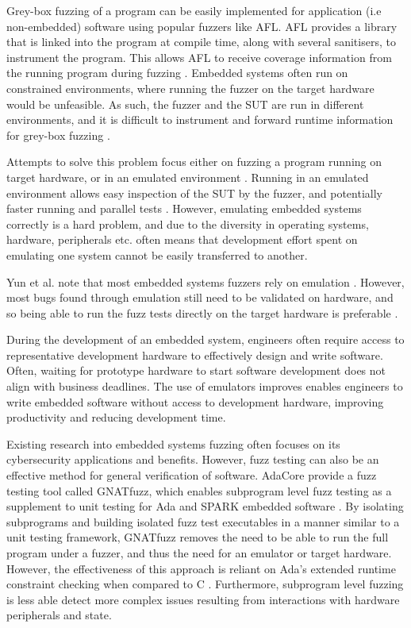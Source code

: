 \documentclass[../report.tex]{subfiles}
\begin{document}
Grey-box fuzzing of a program can be easily implemented for application (i.e
non-embedded) software using popular fuzzers like AFL. AFL provides a library
that is linked into the program at compile time, along with several sanitisers,
to instrument the program. This allows AFL to receive coverage information from
the running program during fuzzing \citep{AFL_2019}. Embedded systems often run on
constrained environments, where running the fuzzer on the target hardware would
be unfeasible.
As such, the fuzzer and the SUT are run in different
environments, and it is difficult to instrument and forward runtime information
for grey-box fuzzing \citep{Muench_2018}.
%

Attempts to solve this problem focus either on fuzzing a program running on
target hardware, or in an emulated environment \citep{Eisele_et_al_2022}.
Running in an emulated environment allows easy inspection of the SUT by the
fuzzer, and potentially faster running and parallel tests
\citep{Eisele_et_al_2022}. However, emulating embedded systems correctly is a
hard problem, and due to the diversity in operating systems, hardware,
peripherals etc. often means that development effort spent on emulating one
system cannot be easily transferred to another.

Yun et al. note that most embedded systems fuzzers rely on emulation
\citep{Yun_2022}. However, most bugs found through emulation still need to be
validated on hardware, and so being able to run the fuzz tests directly on the
target hardware is preferable \citep{Eisele_et_al_2022}.

During the development of an embedded system, engineers often require access to
representative development hardware to effectively design and write software.
Often, waiting for prototype hardware to start software development does not
align with business deadlines. The use of emulators improves enables engineers
to write embedded software without access to development hardware, improving
productivity and reducing development time.

Existing research into embedded systems fuzzing often focuses on its
cybersecurity applications and benefits. However, fuzz testing can also be an
effective method for general verification of software. AdaCore provide a fuzz
testing tool called GNATfuzz, which enables subprogram level fuzz testing as a
supplement to unit testing for Ada and SPARK embedded software
\citep{gnatfuzz}. By isolating subprograms and building isolated fuzz test
executables in a manner similar to a unit testing framework, GNATfuzz removes
the need to be able to run the full program under a fuzzer, and thus the need
for an emulator or target hardware. However, the effectiveness of this approach
is reliant on Ada's extended runtime constraint checking when compared to C
\citep{gnatfuzz}. Furthermore, subprogram level fuzzing is less able detect
more complex issues resulting from interactions with hardware peripherals and
state.
\end{document}
